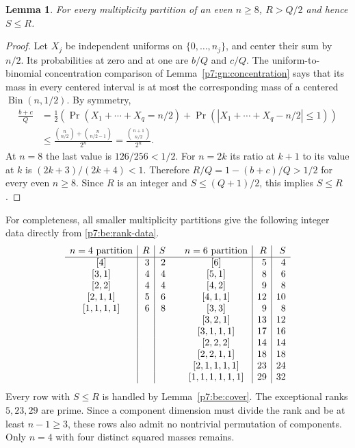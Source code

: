\documentclass[11pt,a4paper]{article}
\newtheorem{lemma}[theorem]{Lemma}
\theoremstyle{definition}
\theoremstyle{remark}
\numberwithin{equation}{section}
\begin{document}
\begin{lemma}\label{p7:be:large-n}
For every multiplicity partition of an even $n\geq8$,
$R>Q/2$ and hence $S\leq R$.
\end{lemma}
\begin{proof}
Let $X_j$ be independent uniforms on $\{0,\ldots,n_j\}$,
and center their sum by $n/2$.  Its probabilities at zero and
at one are $b/Q$ and $c/Q$.  The uniform-to-binomial
concentration comparison of Lemma~\ref{p7:gn:concentration}
says that its mass in every centered interval is at most the
corresponding mass of a centered $\operatorname{Bin}(n,1/2)$.
By symmetry,
\[
\begin{aligned}
 \frac{b+c}{Q}
 &=\frac12\left(\Pr(X_1+\cdots+X_q=n/2)
              +\Pr(|X_1+\cdots+X_q-n/2|\leq1)\right)\\
 &\leq\frac{\binom n{n/2}+\binom n{n/2-1}}{2^n}
 =\frac{\binom{n+1}{n/2}}{2^n}.
\end{aligned}
\]
At $n=8$ the last value is $126/256<1/2$.
For $n=2k$ its ratio at $k+1$ to its value at $k$ is
$(2k+3)/(2k+4)<1$.  Therefore $R/Q=1-(b+c)/Q>1/2$
for every even $n\geq8$.  Since $R$ is an integer and
$S\leq(Q+1)/2$, this implies $S\leq R$.
\end{proof}

For completeness, all smaller multiplicity partitions give
the following integer data directly from \eqref{p7:be:rank-data}.
\[
\begin{array}{c|r|r@{\qquad}c|r|r}
 n=4\text{ partition}&R&S&n=6\text{ partition}&R&S\\\hline
 {[4]}&3&2 &{[6]}&5&4\\
 {[3,1]}&4&4 &{[5,1]}&8&6\\
 {[2,2]}&4&4 &{[4,2]}&9&8\\
 {[2,1,1]}&5&6 &{[4,1,1]}&12&10\\
 {[1,1,1,1]}&6&8 &{[3,3]}&9&8\\
 && &{[3,2,1]}&13&12\\
 && &{[3,1,1,1]}&17&16\\
 && &{[2,2,2]}&14&14\\
 && &{[2,2,1,1]}&18&18\\
 && &{[2,1,1,1,1]}&23&24\\
 && &{[1,1,1,1,1,1]}&29&32
\end{array}
\]
Every row with $S\leq R$ is handled by Lemma~\ref{p7:be:cover}.
The exceptional ranks $5,23,29$ are prime.  Since a component
dimension must divide the rank and be at least $n-1\geq3$,
these rows also admit no nontrivial permutation of components.
Only $n=4$ with four distinct squared masses remains.
\end{document}
